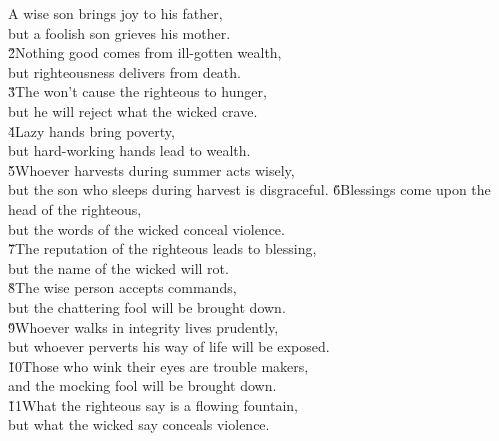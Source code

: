 \begin{poetry}
\poeml A wise son brings joy to his father, \\
\poemll    but a foolish son grieves his mother. \\
\poeml \v{2}Nothing good comes from ill-gotten wealth, \\
\poemll    but righteousness delivers from death. \\
\poeml \v{3}The  won't cause the righteous to hunger, \\
\poemll    but he will reject what the wicked crave. \\
\poeml \v{4}Lazy hands bring poverty, \\
\poemll    but hard-working hands lead to wealth. \\
\poeml \v{5}Whoever harvests during summer acts wisely, \\
\poemll    but the son who sleeps during harvest is disgraceful.
\poeml \v{6}Blessings come upon the head of the righteous, \\
\poemll    but the words of the wicked conceal violence. \\
\poeml \v{7}The reputation of the righteous leads to blessing, \\
\poemll    but the name of the wicked will rot. \\
\poeml \v{8}The wise person accepts commands, \\
\poemll    but the chattering fool will be brought down. \\
\poeml \v{9}Whoever walks in integrity lives prudently, \\
\poemll    but whoever perverts his way of life will be exposed. \\
\poeml \v{10}Those who wink their eyes are trouble makers, \\
\poemll    and the mocking fool will be brought down. \\
\poeml \v{11}What the righteous say is a flowing fountain, \\
\poemll    but what the wicked say conceals violence. \\

\end{poetry}
